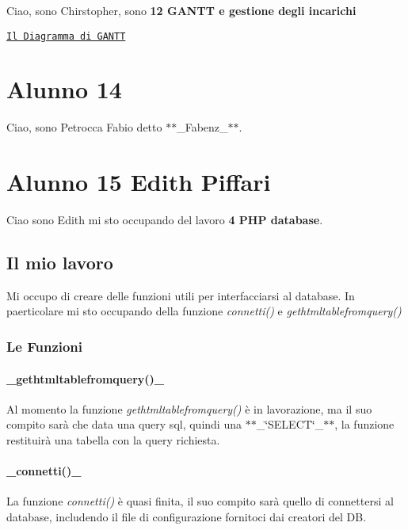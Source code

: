 Ciao, sono Chirstopher, sono {\bfseries 12 G\+A\+N\+TT e gestione degli incarichi}
\begin{DoxyItemize}
\item \href{http://htmlpreview.github.io/?https://github.com/simonemastella/5BIT/blob/master/documenti/diagramma_di_gantt.html}{\tt Il Diagramma di G\+A\+N\+TT} \section*{Alunno 14}
\end{DoxyItemize}

Ciao, sono Petrocca Fabio detto $\ast$$\ast$\+\_\+\+Fabenz\+\_\+$\ast$$\ast$. \section*{Alunno 15 Edith Piffari}

Ciao sono Edith mi sto occupando del lavoro {\bfseries 4 P\+HP database}. \subsection*{Il mio lavoro}

Mi occupo di creare delle funzioni utili per interfacciarsi al database. In paerticolare mi sto occupando della funzione {\itshape connetti()} e {\itshape gethtmltablefromquery()} \subsubsection*{Le Funzioni}

\paragraph*{\+\_\+gethtmltablefromquery()\+\_\+}

Al momento la funzione {\itshape gethtmltablefromquery()} è in lavorazione, ma il suo compito sarà che data una query sql, quindi una $\ast$$\ast$\+\_\+\char`\"{}\+S\+E\+L\+E\+C\+T\char`\"{}\+\_\+$\ast$$\ast$, la funzione restituirà una tabella con la query richiesta. \paragraph*{\+\_\+connetti()\+\_\+}

La funzione {\itshape connetti()} è quasi finita, il suo compito sarà quello di connettersi al database, includendo il file di configurazione fornitoci dai creatori del DB.

